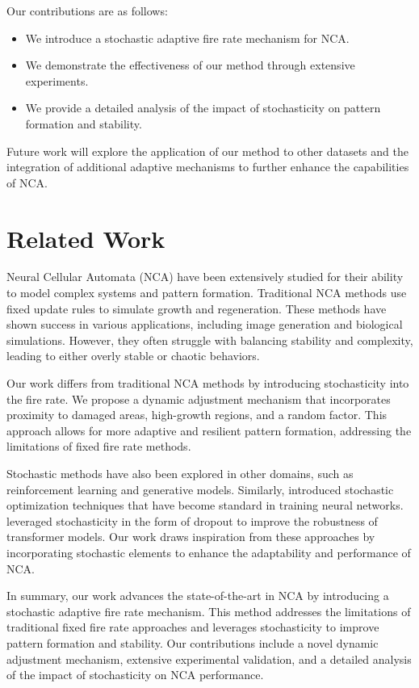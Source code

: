 \documentclass{article} %
\begin{document}
Our contributions are as follows:
\begin{itemize}
    \item We introduce a stochastic adaptive fire rate mechanism for NCA.
    \item We demonstrate the effectiveness of our method through extensive experiments.
    \item We provide a detailed analysis of the impact of stochasticity on pattern formation and stability.
\end{itemize}

Future work will explore the application of our method to other datasets and the integration of additional adaptive mechanisms to further enhance the capabilities of NCA.

\section{Related Work}
\label{sec:related}

Neural Cellular Automata (NCA) have been extensively studied for their ability to model complex systems and pattern formation. Traditional NCA methods use fixed update rules to simulate growth and regeneration. These methods have shown success in various applications, including image generation and biological simulations. However, they often struggle with balancing stability and complexity, leading to either overly stable or chaotic behaviors.

Our work differs from traditional NCA methods by introducing stochasticity into the fire rate. We propose a dynamic adjustment mechanism that incorporates proximity to damaged areas, high-growth regions, and a random factor. This approach allows for more adaptive and resilient pattern formation, addressing the limitations of fixed fire rate methods.

Stochastic methods have also been explored in other domains, such as reinforcement learning and generative models. Similarly, \citet{kingma2014adam} introduced stochastic optimization techniques that have become standard in training neural networks. \citet{vaswani2017attention} leveraged stochasticity in the form of dropout to improve the robustness of transformer models. Our work draws inspiration from these approaches by incorporating stochastic elements to enhance the adaptability and performance of NCA.

In summary, our work advances the state-of-the-art in NCA by introducing a stochastic adaptive fire rate mechanism. This method addresses the limitations of traditional fixed fire rate approaches and leverages stochasticity to improve pattern formation and stability. Our contributions include a novel dynamic adjustment mechanism, extensive experimental validation, and a detailed analysis of the impact of stochasticity on NCA performance.
\end{document}
